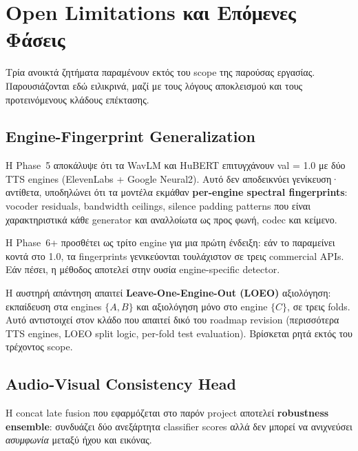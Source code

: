 \section{Open Limitations και Επόμενες Φάσεις}
\label{sec:open-limitations}

Τρία ανοικτά ζητήματα παραμένουν εκτός του scope της παρούσας εργασίας.
Παρουσιάζονται εδώ ειλικρινά,
μαζί με τους λόγους αποκλεισμού και τους προτεινόμενους κλάδους επέκτασης.

\subsection{Engine-Fingerprint Generalization}
\label{subsec:engine-fingerprint-generalization}

Η Phase~5 αποκάλυψε ότι τα WavLM και HuBERT επιτυγχάνουν
val \AUC{} = 1.0 με δύο TTS engines (ElevenLabs + Google Neural2).
Αυτό δεν αποδεικνύει γενίκευση· αντίθετα,
υποδηλώνει ότι τα μοντέλα εκμάθαν
\textbf{per-engine spectral fingerprints}:
vocoder residuals, bandwidth ceilings, silence padding patterns
που είναι χαρακτηριστικά κάθε generator
και αναλλοίωτα ως προς φωνή, codec και κείμενο.

Η Phase~6+ προσθέτει  ως τρίτο engine
για μια πρώτη ένδειξη: εάν το \AUC{} παραμείνει κοντά στο 1.0,
τα fingerprints γενικεύονται τουλάχιστον σε τρεις commercial APIs.
Εάν πέσει, η μέθοδος αποτελεί στην ουσία engine-specific detector.

Η αυστηρή απάντηση απαιτεί \textbf{Leave-One-Engine-Out (LOEO)} αξιολόγηση:
εκπαίδευση στα engines $\{A, B\}$ και αξιολόγηση μόνο στο engine $\{C\}$,
σε τρεις folds.
Αυτό αντιστοιχεί στον κλάδο 
που απαιτεί δικό του roadmap revision
(περισσότερα TTS engines, LOEO split logic,
per-fold test evaluation).
Βρίσκεται ρητά εκτός του τρέχοντος scope.

\subsection{Audio-Visual Consistency Head}
\label{subsec:av-consistency}

Η concat late fusion που εφαρμόζεται στο παρόν project
αποτελεί \textbf{robustness ensemble}:
συνδυάζει δύο ανεξάρτητα classifier scores
αλλά δεν μπορεί να ανιχνεύσει
\emph{ασυμφωνία} μεταξύ ήχου και εικόνας.

